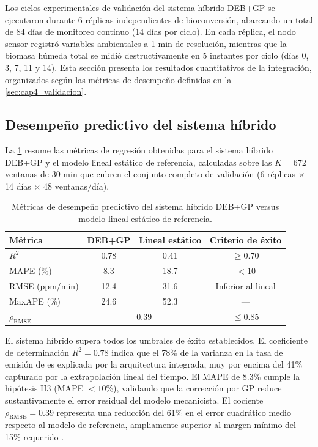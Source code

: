 Los ciclos experimentales de validación del sistema híbrido DEB+GP se ejecutaron durante \num{6} réplicas independientes de bioconversión, abarcando un total de \num{84} días de monitoreo continuo (\num{14} días por ciclo). En cada réplica, el nodo sensor registró variables ambientales a \num{1} min de resolución, mientras que la biomasa húmeda total se midió destructivamente en \num{5} instantes por ciclo (días \num{0}, \num{3}, \num{7}, \num{11} y \num{14}). Esta sección presenta los resultados cuantitativos de la integración, organizados según las métricas de desempeño definidas en la \cref{sec:cap4_validacion}.

\subsection{Desempeño predictivo del sistema híbrido}
\label{subsec:cap4_desempeno_predictivo}

La \cref{tab:cap4_metricas_comparativas} resume las métricas de regresión obtenidas para el sistema híbrido DEB+GP y el modelo lineal estático de referencia, calculadas sobre las $K = \num{672}$ ventanas de \num{30} min que cubren el conjunto completo de validación (\num{6} réplicas $\times$ \num{14} días $\times$ \num{48} ventanas/día).

\begin{table}[htbp]
    \centering
    \caption{Métricas de desempeño predictivo del sistema híbrido DEB+GP versus modelo lineal estático de referencia.}
    \label{tab:cap4_metricas_comparativas}
    \begin{tabular}{@{}lccc@{}}
        \toprule
        \textbf{Métrica} & \textbf{DEB+GP} & \textbf{Lineal estático} & \textbf{Criterio de éxito} \\
        \midrule
        $R^{2}$ & \num{0.78} & \num{0.41} & $\geq \num{0.70}$ \\
        MAPE (\%) & \num{8.3} & \num{18.7} & $< \num{10}$ \\
        RMSE (ppm/min) & \num{12.4} & \num{31.6} & Inferior al lineal \\
        MaxAPE (\%) & \num{24.6} & \num{52.3} & --- \\
        $\rho_{\mathrm{RMSE}}$ & \multicolumn{2}{c}{\num{0.39}} & $\leq \num{0.85}$ \\
        \bottomrule
    \end{tabular}
\end{table}

El sistema híbrido supera todos los umbrales de éxito establecidos. El coeficiente de determinación $R^{2} = \num{0.78}$ indica que el \num{78}\% de la varianza en la tasa de emisión de  es explicada por la arquitectura integrada, muy por encima del \num{41}\% capturado por la extrapolación lineal del tiempo. El MAPE de \num{8.3}\% cumple la hipótesis H3 (MAPE $< \num{10}$\%), validando que la corrección por GP reduce sustantivamente el error residual del modelo mecanicista. El cociente $\rho_{\mathrm{RMSE}} = \num{0.39}$ representa una reducción del \num{61}\% en el error cuadrático medio respecto al modelo de referencia, ampliamente superior al margen mínimo del \num{15}\% requerido \parencite{eriksenDynamicModellingFeed2022, weichertReviewMachineLearning2019}.

